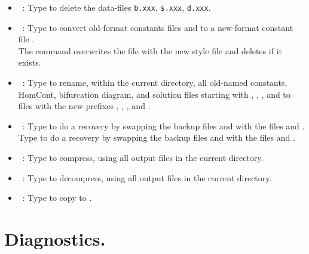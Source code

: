 \documentclass[12pt]{report}
\begin{document}
\begin{itemize}
\item[\tt @dl]~:
  Type  
 to delete the data-files 
  {\tt b.xxx}, {\tt s.xxx}, {\tt d.xxx}.

\item[\tt @cnvc]~:
  Type  to convert old-format constants files
 and  to a new-format constant file
.\\
  The command  overwrites the file 
  with the new style file and deletes  if it exists.

\item[\tt @rn]~:
  Type  to rename, within the current directory, all
  old-named constants, HomCont, bifurcation
  diagram, and solution files starting with , ,
  , and  to files with the new prefixes
  , , , and .

\item[\tt @rc]~:
  Type  to do a recovery by swapping the backup files
   and  with the files
   and .\\
  Type  to do a recovery by swapping the backup files
   and  with the files
   and .

\item[\tt @gz]~:
  Type  to compress, using  all output
  files in the current directory.

\item[\tt @uz]~:
  Type  to decompress, using  all output
  files in the current directory.

\item[\tt @sr]~:
  Type  to copy  to .

\end{itemize}

\section{ Diagnostics.} 
\end{document}
